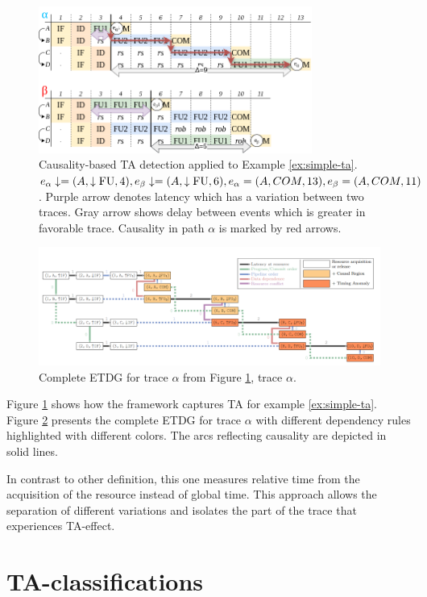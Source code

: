 \begin{figure}[htbp]
    \centering
    \includegraphics[width=0.8\textwidth]{figures/multiscalar_ta_causality.png}
    \caption{Causality-based TA detection applied to Example \ref{ex:simple-ta}. $e_\alpha\downarrow = (A, \downarrow\mathrm{FU}, 4), e_\beta\downarrow = (A, \downarrow\mathrm{FU}, 6), e_\alpha = (A, COM, 13), e_\beta = (A, COM, 11)$. Purple arrow denotes latency which has a variation between two traces. Gray arrow shows delay between events which is greater in favorable trace. Causality in  path $\alpha$ is marked by red arrows.}
    \label{fig:multiscalar-ta-causality}
\end{figure}

\begin{figure}[htbp]
    \centering
    \includegraphics[width=\textwidth]{figures/ETDG.png}
    \caption{Complete ETDG for trace $\alpha$ from Figure \ref{fig:multiscalar-ta-causality}, trace $\alpha$. }
    \label{fig:ETDG}
\end{figure}

Figure \ref{fig:multiscalar-ta-causality} shows how the framework captures TA for example \ref{ex:simple-ta}. Figure \ref{fig:ETDG} presents the complete ETDG for trace $\alpha$ with different dependency rules highlighted with different colors. The arcs reflecting causality are depicted in solid lines.

In contrast to other definition, this one measures relative time from the acquisition of the resource instead of global time. This approach allows the separation of different variations and isolates the part of the trace that experiences TA-effect.


\section{TA-classifications}

